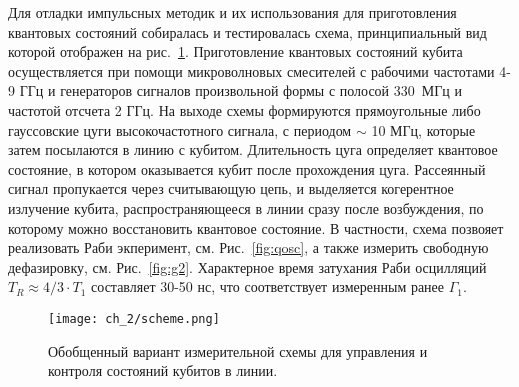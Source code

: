 Для отладки импульсных методик и их использования для приготовления квантовых состояний собиралась и тестировалась схема, принципиальный вид которой отображен на рис.~\ref{fig: time_domain}. Приготовление квантовых состояний кубита осуществляется при помощи микроволновых смесителей с рабочими частотами 4-9 ГГц и генераторов сигналов произвольной формы с полосой $330$~МГц и частотой отсчета 2 ГГц. На выходе схемы формируются прямоугольные либо гауссовские цуги высокочастотного сигнала, с периодом $\sim$ 10 МГц, которые затем посылаются в линию с кубитом. Длительность цуга определяет квантовое состояние, в котором оказывается кубит после прохождения цуга. Рассеянный сигнал пропукается через считывающую цепь, и выделяется когерентное излучение кубита, распространяющееся в линии сразу после возбуждения, по которому можно восстановить квантовое состояние. В частности, схема позвояет реализовать Раби экперимент, см. Рис.~\ref{fig:qosc}, а также измерить свободную дефазировку, см. Рис.~\ref{fig:g2}. Характерное время затухания Раби осцилляций  $T_R \approx 4/3\cdot T_1$ составляет 30-50 нс, что соответствует измеренным ранее $\Gamma_1$. 

\begin{figure}[htb]\center
	\texttt{[image: ch\_2/scheme.png]} \hfill
	\caption[width=0.6\textwidth]{Обобщенный вариант измерительной схемы для управления и контроля состояний кубитов в линии.}
	\label{fig: time_domain}
\end{figure}

